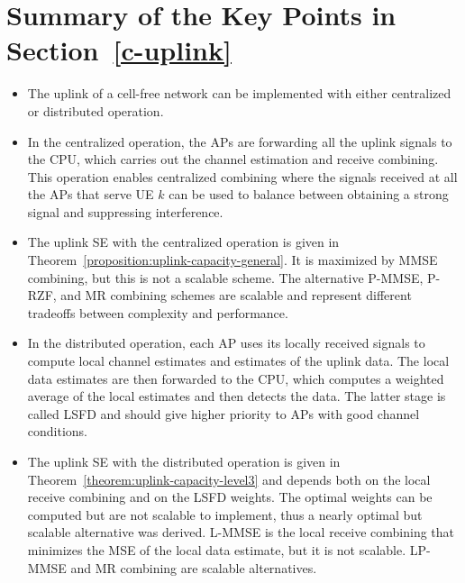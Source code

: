 \newpage

\section{Summary of the Key Points in Section~\ref{c-uplink}}
\label{c-uplink-summary}

\begin{mdframed}[style=GrayFrame]

\begin{itemize}
\item The uplink of a cell-free network can be implemented with either centralized or distributed operation.

\item In the centralized operation, the APs are forwarding all the uplink signals to the CPU, which carries out the channel estimation and receive combining. This operation enables centralized combining where the signals received at all the APs that serve UE $k$ can be used to balance between obtaining a strong signal and suppressing interference.

\item The uplink SE with the centralized operation is given in Theorem~\ref{proposition:uplink-capacity-general}. It is maximized by MMSE combining, but this is not a scalable scheme. The alternative  P-MMSE, P-RZF, and MR combining schemes are scalable and represent different tradeoffs between complexity and performance.

\item In the distributed operation, each AP uses its locally received signals to compute local channel estimates and estimates of the uplink data. The local data estimates are then forwarded to the CPU, which computes a weighted average of the local estimates and then detects the data. The latter stage is called LSFD and should give higher priority to APs with good channel conditions.

\item The uplink SE with the distributed operation is given in Theorem~\ref{theorem:uplink-capacity-level3} and depends both on the local receive combining and on the LSFD weights. The optimal weights can be computed but are not scalable to implement, thus a nearly optimal but scalable alternative was derived. L-MMSE is the local receive combining that minimizes the MSE of the local data estimate, but it is not scalable. LP-MMSE and MR combining are scalable alternatives. 


\end{itemize}

\end{mdframed}

